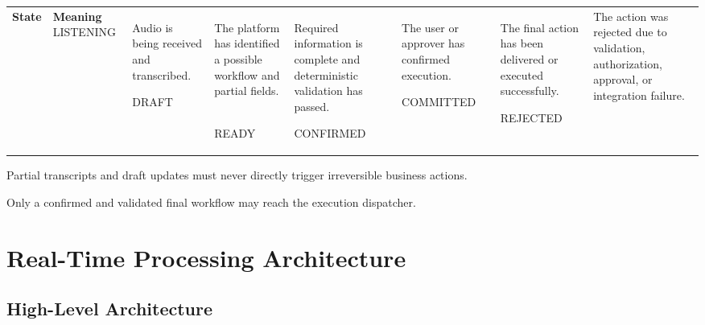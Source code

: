 \documentclass[11pt,a4paper]{article}
\begin{document}
\begin{tabularx}{\textwidth}{L{30mm}Y}
\toprule
\textbf{State} & \textbf{Meaning} \
\midrule
LISTENING
& Audio is being received and transcribed. \

DRAFT
& The platform has identified a possible workflow and partial fields. \

READY
& Required information is complete and deterministic validation has passed. \

CONFIRMED
& The user or approver has confirmed execution. \

COMMITTED
& The final action has been delivered or executed successfully. \

REJECTED
& The action was rejected due to validation, authorization, approval, or integration failure. \
\bottomrule
\end{tabularx}

\begin{warningbox}
Partial transcripts and draft updates must never directly trigger
irreversible business actions.

Only a confirmed and validated final workflow may reach the execution
dispatcher.
\end{warningbox}

\section{Real-Time Processing Architecture}

\subsection{High-Level Architecture}
\end{document}
